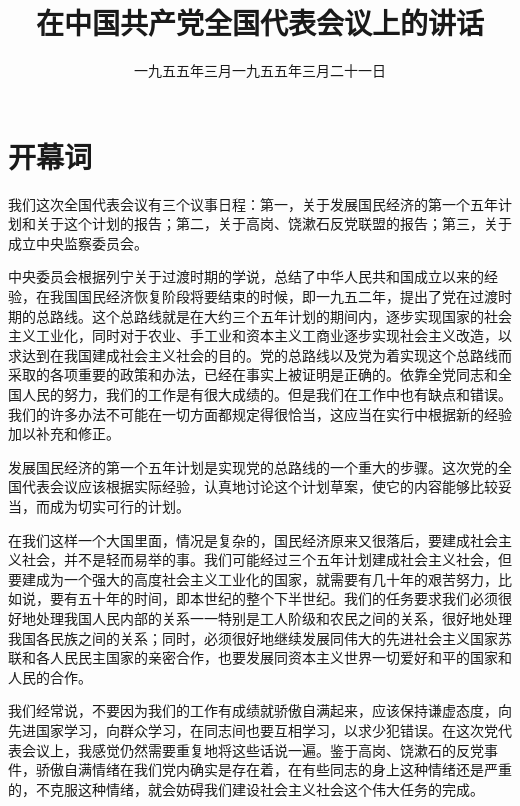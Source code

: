 
\title{在中国共产党全国代表会议上的讲话}
\date{一九五五年三月}
\maketitle


\date{一九五五年三月二十一日}
\section{开幕词}


我们这次全国代表会议有三个议事日程：第一，关于发展国民经济的第一个五年计划和关于这个计划的报告；第二，关于高岗、饶漱石反党联盟的报告；第三，关于成立中央监察委员会。

中央委员会根据列宁关于过渡时期的学说，总结了中华人民共和国成立以来的经验，在我国国民经济恢复阶段将要结束的时候，即一九五二年，提出了党在过渡时期的总路线。这个总路线就是在大约三个五年计划的期间内，逐步实现国家的社会主义工业化，同时对于农业、手工业和资本主义工商业逐步实现社会主义改造，以求达到在我国建成社会主义社会的目的。党的总路线以及党为着实现这个总路线而采取的各项重要的政策和办法，已经在事实上被证明是正确的。依靠全党同志和全国人民的努力，我们的工作是有很大成绩的。但是我们在工作中也有缺点和错误。我们的许多办法不可能在一切方面都规定得很恰当，这应当在实行中根据新的经验加以补充和修正。

发展国民经济的第一个五年计划是实现党的总路线的一个重大的步骤。这次党的全国代表会议应该根据实际经验，认真地讨论这个计划草案，使它的内容能够比较妥当，而成为切实可行的计划。

在我们这样一个大国里面，情况是复杂的，国民经济原来又很落后，要建成社会主义社会，并不是轻而易举的事。我们可能经过三个五年计划建成社会主义社会，但要建成为一个强大的高度社会主义工业化的国家，就需要有几十年的艰苦努力，比如说，要有五十年的时间，即本世纪的整个下半世纪。我们的任务要求我们必须很好地处理我国人民内部的关系一一特别是工人阶级和农民之间的关系，很好地处理我国各民族之间的关系；同时，必须很好地继续发展同伟大的先进社会主义国家苏联和各人民民主国家的亲密合作，也要发展同资本主义世界一切爱好和平的国家和人民的合作。

我们经常说，不要因为我们的工作有成绩就骄傲自满起来，应该保持谦虚态度，向先进国家学习，向群众学习，在同志间也要互相学习，以求少犯错误。在这次党代表会议上，我感觉仍然需要重复地将这些话说一遍。鉴于高岗、饶漱石的反党事件，骄傲自满情绪在我们党内确实是存在着，在有些同志的身上这种情绪还是严重的，不克服这种情绪，就会妨碍我们建设社会主义社会这个伟大任务的完成。

